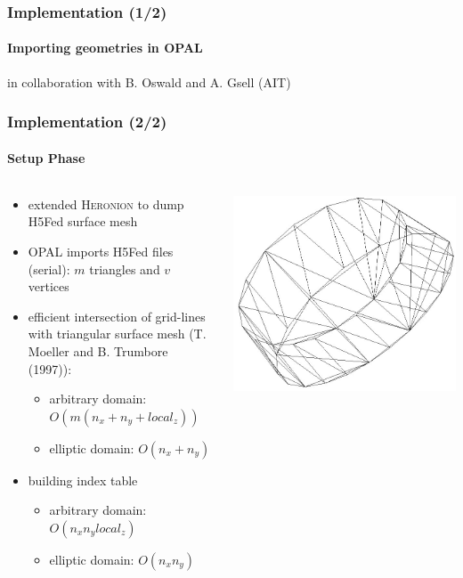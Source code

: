 \documentclass[xcolor=pdftex,table,10pt]{beamer}
\newcommand{\opal}{\textsc{OPAL }}
\begin{document}
	\begin{frame}
		\frametitle{Implementation (1/2)}
		\framesubtitle{Importing geometries in \opal}

		\begin{center}
			
		\end{center}

		\small{in collaboration with B. Oswald and A. Gsell (AIT)}

	\end{frame}
	
	\begin{frame}
		\frametitle{Implementation (2/2)}
		\framesubtitle{Setup Phase}

		\begin{columns}
		\begin{column}{6.6cm}
		\begin{itemize}
			\item extended \textsc{Heronion} to dump H5Fed surface mesh
			\item \opal imports H5Fed files (serial): $m$ triangles and $v$ vertices
			\item efficient intersection of grid-lines with triangular surface mesh (T. Moeller and B. Trumbore (1997)): 
				\begin{itemize}
					\item arbitrary domain: $O(m(n_x+n_y+local_z))$ 
					\item elliptic domain: $O(n_x + n_y)$
				\end{itemize}
			\item building index table
				\begin{itemize}
					\item arbitrary domain: $O(n_x n_y local_z)$
					\item elliptic domain: $O(n_x n_y)$
				\end{itemize}
		\end{itemize}
		\end{column}
		\begin{column}{4cm}	
			\begin{center}
			\includegraphics[width=1.0\textwidth]{cylinder.jpg}

\end{center}
\end{column}
\end{columns}
\end{frame}
\end{document}
